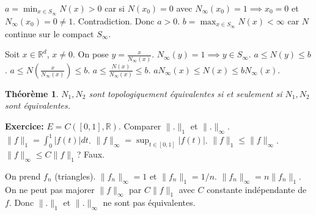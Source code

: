 \documentclass{article}
\newtheorem{theorem}{Théorème}
\begin{document}
$a = \min_{x \in S_\infty} N(x) > 0$ car si $N(x_0) = 0$ avec $N_\infty(x_0) = 1 \implies x_0 = 0$ et $N_\infty(x_0) = 0 \neq 1$. Contradiction. Donc $a > 0$.
$b = \max_{x \in S_\infty} N(x) < \infty$ car $N$ continue sur le compact $S_\infty$.

Soit $x \in \mathbb{R}^d$, $x \neq 0$. On pose $y = \frac{x}{N_\infty(x)}$. $N_\infty(y) = 1 \implies y \in S_\infty$.
$a \leq N(y) \leq b$.
$a \leq N \left( \frac{x}{N_\infty(x)} \right) \leq b$.
$a \leq \frac{N(x)}{N_\infty(x)} \leq b$.
$a N_\infty(x) \leq N(x) \leq b N_\infty(x)$.

\begin{theorem}
\label{thm:topo_equiv_iff_equiv_again}
$N_1, N_2$ sont topologiquement équivalentes si et seulement si $N_1, N_2$ sont équivalentes.
\end{theorem}

\textbf{Exercice:} $E = C([0, 1], \mathbb{R})$. Comparer $\|.\|_1$ et $\|.\|_\infty$.
$\|f\|_1 = \int_0^1 |f(t)| dt$.
$\|f\|_\infty = \sup_{t \in [0, 1]} |f(t)|$.
$\|f\|_1 \leq \|f\|_\infty$.
$\|f\|_\infty \leq C \|f\|_1$? Faux.

On prend $f_n$ (triangles). $\|f_n\|_\infty = 1$ et $\|f_n\|_1 = 1/n$.
$\|f_n\|_\infty = n \|f_n\|_1$.
On ne peut pas majorer $\|f\|_\infty$ par $C \|f\|_1$ avec $C$ constante indépendante de $f$.
Donc $\|.\|_1$ et $\|.\|_\infty$ ne sont pas équivalentes.
\end{document}
